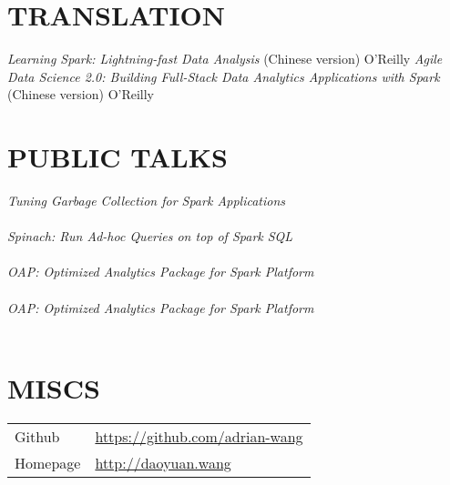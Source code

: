\documentclass[line,margin]{res}
\begin{document}
\begin{resume}
\section{TRANSLATION}
            {\sl Learning Spark: Lightning-fast Data Analysis} (Chinese version) \hfill O'Reilly
            {\sl Agile Data Science 2.0: Building Full-Stack Data Analytics Applications with Spark} (Chinese version) \hfill O'Reilly

\section{PUBLIC TALKS}
            {\sl Tuning Garbage Collection for Spark Applications}\\
                \\
            {\sl Spinach: Run Ad-hoc Queries on top of Spark SQL}\\
                \\
            {\sl OAP: Optimized Analytics Package for Spark Platform}\\
                \\
            {\sl OAP: Optimized Analytics Package for Spark Platform}\\
                \\

\section{MISCS}
            \begin{tabular}{p{}p{}}
            {Github} &\href{https://github.com/adrian-wang}{https://github.com/adrian-wang}\\
            {Homepage} &\href{http://daoyuan.wang}{http://daoyuan.wang}\\
            \end{tabular}
\end{resume}
\end{document}
